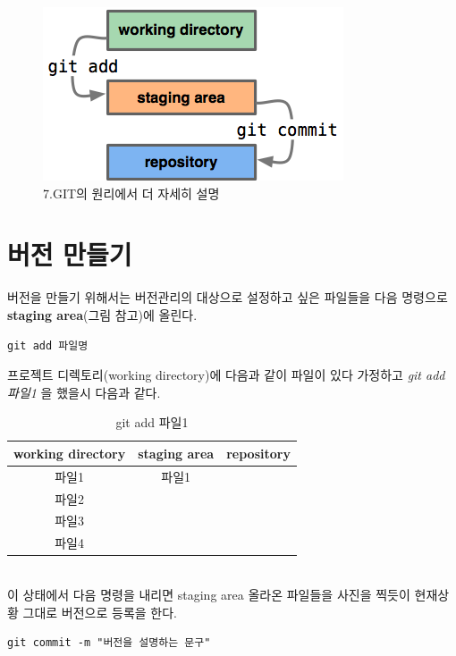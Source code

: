 \documentclass[letterpaper,12pt]{article}
\begin{document}
\begin{figure}[ht] 
        \centering \includegraphics[width=0.8\columnwidth]{git}
         \caption{
                \label{fig:git}  
                7.GIT의 원리에서 더 자세히 설명
        }
\end{figure}
\section{버전 만들기}
버전을 만들기 위해서는 버전관리의 대상으로 설정하고 싶은 파일들을 다음 명령으로 \textbf{staging area}(그림 참고)에 올린다.
\begin{verbatim}
git add 파일명
\end{verbatim}
프로젝트 디렉토리(working directory)에 다음과 같이 파일이 있다 가정하고 \textit{git add 파일1} 을 했을시 다음과 같다.
\begin{table}[ht]
\begin{center}
\label{tbl:bins} %
\begin{tabular}{|ccc|} 
\hline
\multicolumn{1}{|c}{working directory} & \multicolumn{1}{c}{staging area} & repository\\
\hline
파일1 &   파일1 & \\
파일2 &    & \\
파일3 &    & \\
파일4 &    & \\
\hline
\end{tabular}
\end{center}
\caption{git add 파일1}
\end{table}
\\이 상태에서 다음 명령을 내리면 staging area 올라온 파일들을 사진을 찍듯이 현재상황 그대로 버전으로 등록을 한다. 
\begin{verbatim}
git commit -m "버전을 설명하는 문구"
\end{verbatim}
\end{document}
